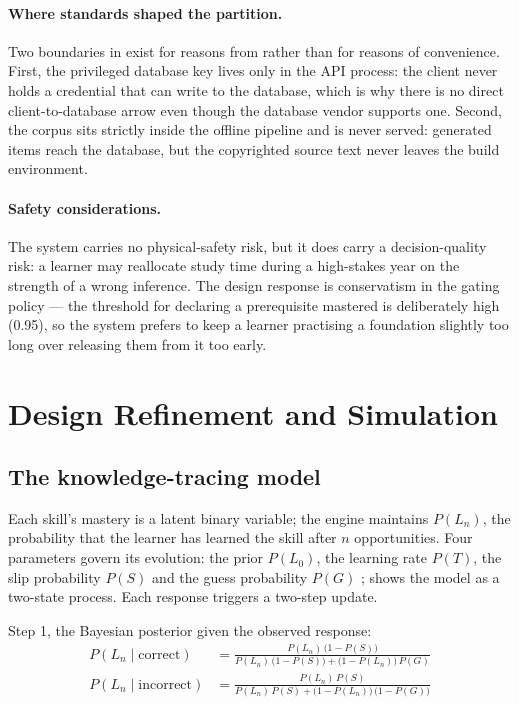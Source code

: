 \paragraph{Where standards shaped the partition.} Two boundaries in
 exist for reasons from  rather than
for reasons of convenience. First, the privileged database key lives only in the
API process: the client never holds a credential that can write to the database,
which is why there is no direct client-to-database arrow even though the
database vendor supports one. Second, the corpus sits strictly inside the
offline pipeline and is never served: generated items reach the database, but
the copyrighted source text never leaves the build environment.

\paragraph{Safety considerations.} The system carries no physical-safety risk,
but it does carry a decision-quality risk: a learner may reallocate study time
during a high-stakes year on the strength of a wrong inference. The design
response is conservatism in the gating policy --- the threshold for declaring a
prerequisite mastered is deliberately high (0.95), so the system prefers to keep
a learner practising a foundation slightly too long over releasing them from it
too early.

\section{Design Refinement and Simulation}
\label{sec:detailed-design}

\subsection{The knowledge-tracing model}
\label{sec:bkt-model}

Each skill's mastery is a latent binary variable; the engine maintains
$P(L_n)$, the probability that the learner has learned the skill after $n$
opportunities. Four parameters govern its evolution: the prior $P(L_0)$, the
learning rate $P(T)$, the slip probability $P(S)$ and the guess probability
$P(G)$ \cite{corbett1995knowledge};  shows the model as a
two-state process. Each response triggers a two-step update.



Step 1, the Bayesian posterior given the observed response:
\begin{align}
  P(L_n \mid \text{correct}) &=
    \frac{P(L_n)\,\bigl(1-P(S)\bigr)}
         {P(L_n)\,\bigl(1-P(S)\bigr) + \bigl(1-P(L_n)\bigr)\,P(G)}
  \label{eq:posterior-correct}\\[2mm]
  P(L_n \mid \text{incorrect}) &=
    \frac{P(L_n)\,P(S)}
         {P(L_n)\,P(S) + \bigl(1-P(L_n)\bigr)\,\bigl(1-P(G)\bigr)}
  \label{eq:posterior-incorrect}
\end{align}

